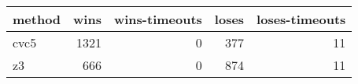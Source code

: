 \begin{tabular}{lrrrr}
\hline
 method   &   wins &   wins-timeouts &   loses &   loses-timeouts \\
\hline
 cvc5     &   1321 &               0 &     377 &               11 \\
 z3       &    666 &               0 &     874 &               11 \\
\hline
\end{tabular}
